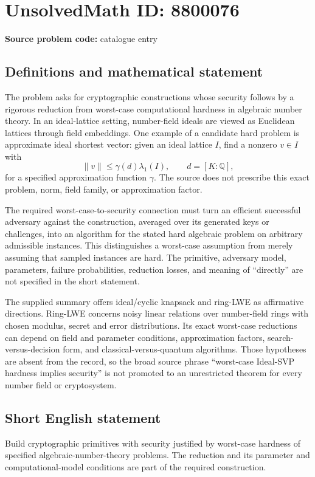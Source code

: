 \documentclass[11pt]{article}
\newcommand{\Q}{\mathbb{Q}}
\begin{document}
\section*{UnsolvedMath ID: 8800076}
\textbf{Source problem code:} catalogue entry
\subsection{Definitions and mathematical statement}
The problem asks for cryptographic constructions whose security follows by a rigorous reduction from worst-case computational hardness in algebraic number theory. In an ideal-lattice setting, number-field ideals are viewed as Euclidean lattices through field embeddings. One example of a candidate hard problem is approximate ideal shortest vector: given an ideal lattice $I$, find a nonzero $v\in I$ with
\[
 \|v\|\le\gamma(d)\lambda_1(I),
 \qquad d=[K:\Q],
\]
for a specified approximation function $\gamma$. The source does not prescribe this exact problem, norm, field family, or approximation factor.

The required worst-case-to-security connection must turn an efficient successful adversary against the construction, averaged over its generated keys or challenges, into an algorithm for the stated hard algebraic problem on arbitrary admissible instances. This distinguishes a worst-case assumption from merely assuming that sampled instances are hard. The primitive, adversary model, parameters, failure probabilities, reduction losses, and meaning of ``directly'' are not specified in the short statement.

The supplied summary offers ideal/cyclic knapsack and ring-LWE as affirmative directions. Ring-LWE concerns noisy linear relations over number-field rings with chosen modulus, secret and error distributions. Its exact worst-case reductions can depend on field and parameter conditions, approximation factors, search-versus-decision form, and classical-versus-quantum algorithms. Those hypotheses are absent from the record, so the broad source phrase ``worst-case Ideal-SVP hardness implies security'' is not promoted to an unrestricted theorem for every number field or cryptosystem.
\subsection{Short English statement}
Build cryptographic primitives with security justified by worst-case hardness of specified algebraic-number-theory problems. The reduction and its parameter and computational-model conditions are part of the required construction.
\end{document}
